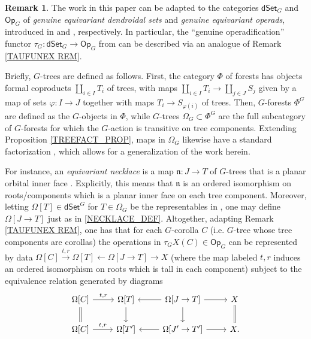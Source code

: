 \documentclass[a4paper,10pt]{article}%
\numberwithin{equation}{section}
\numberwithin{figure}{section}
\theoremstyle{definition} %
\newtheorem{remark}[equation]{Remark}%
\newcommand{\Op}{\mathsf{Op}}
\newcommand{\dSet}{\mathsf{dSet}}
\begin{document}
\begin{remark}\label{GTAUFUNEX REM}
	The work in this paper can be adapted to the categories
	$\mathsf{dSet}_G$ and $\mathsf{Op}_G$
	of \textit{genuine equivariant dendroidal sets} and \textit{genuine equivariant operads},
	introduced in \cite[\S 5.4]{Per18} and \cite{BP_geo}, respectively.
%	
	In particular, 
	the ``genuine operadification'' functor
	$\tau_G \colon \mathsf{dSet}_G \to \mathsf{Op}_G$
	from
	\cite[Eq. (2.42)]{BP_TAS}
	can be described via an analogue of
	Remark \ref{TAUFUNEX REM}.

Briefly, $G$-trees are defined as follows. 
First, the category $\Phi$ of forests has objects
formal coproducts $\amalg_{i\in I} T_i$ of trees,
with maps $\amalg_{i\in I} T_i \to \amalg_{j\in J} S_j$
given by a map of sets $\varphi \colon I \to J$ together with maps
$T_i \to S_{\varphi (i)}$ of trees.
Then, $G$-forests $\Phi^G$ are defined as the $G$-objects in $\Phi$,
while $G$-trees $\Omega_G \subset \Phi^G$
are the full subcategory of $G$-forests for which
the $G$-action is transitive on tree components.
Extending Proposition \ref{TREEFACT_PROP},
maps in $\Omega_G$ likewise have a standard factorization
\cite[Cor. 2.27]{BP_TAS},
which allows for a generalization of the work herein.

For instance, an \emph{equivariant necklace}
is a map $\mathfrak{n} \colon J \to T$ of $G$-trees
that is a planar orbital inner face 
\cite[Def. A.3]{BP_TAS}.
Explicitly, this means that $\mathfrak{n}$
is an ordered isomorphism on roots/components which is a planar inner face on each tree component.
Moreover, letting $\Omega[T] \in \dSet^G$ for $T \in \Omega_G$
 be the representables 
in \cite[\S 2.3]{BP_TAS},
one may define $\Omega[J \to T]$ just as in 
\eqref{NECKLACE_DEF}.
Altogether, adapting Remark \ref{TAUFUNEX REM},
one has that for each $G$-corolla $C$ (i.e. $G$-tree whose tree components are corollas)
the operations in 
$\tau_G X(C) \in \Op_G$
can be represented by data
$\Omega[C] \xrightarrow{t,r}
\Omega[T] \leftarrow
\Omega[J \to T] \to 
X$
(where the map labeled $t,r$ induces an ordered isomorphism on roots which is tall in each component)
subject to the equivalence relation generated by diagrams
\[
\begin{tikzcd}
\Omega[C] \ar{r}{t,r} \ar[equal]{d} &
\Omega[T] \ar{d} &
\Omega[J \to T] \ar{l} \ar{r} \ar{d} &
X \ar[equal]{d}
\\
\Omega[C] \ar{r}{t,r} &
\Omega[T'] &
\Omega[J' \to T'] \ar{l} \ar{r} &
X.
\end{tikzcd}
\]
\end{remark}
\end{document}
